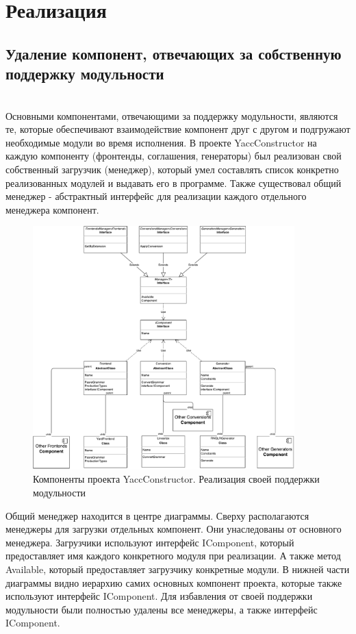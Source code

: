 \documentclass{matmex-diploma}
\begin{document}
\section{Реализация}
\begin{enumerate}
\subsection {Удаление компонент, отвечающих за собственную \\поддержку модульности}
\\Основными компонентами, отвечающими за поддержку модульности, являются те, которые обеспечивают взаимодействие компонент друг с другом и подгружают необходимые модули во время исполнения.
В проекте YaccConstructor на каждую компоненту (фронтенды, соглашения, генераторы) был реализован свой собственный загрузчик (менеджер), который умел составлять список конкретно реализованных модулей и выдавать его в программе. Также существовал общий менеджер - абстрактный интерфейс для реализации каждого отдельного менеджера компонент.

\begin{figure}[h!]
\begin{center}
\includegraphics[width=0.9\textwidth]{yc_was}
\caption{Компоненты проекта YaccConstructor. Реализация своей поддержки модульности}
\label{fig:yc_was} 
\end{center}
\end{figure}

\newpage
Общий менеджер находится в центре диаграммы. Сверху располагаются менеджеры для загрузки отдельных компонент. Они унаследованы от основного менеджера. Загрузчики используют интерфейс IComponent, который предоставляет имя каждого конкретного модуля при реализации. А также метод Available, который предоставляет загрузчику конкретные модули. В нижней части диаграммы видно иерархию самих основных компонент проекта, которые также используют интерфейс  IComponent. Для избавления от своей поддержки модульности были полностью удалены все менеджеры, а также интерфейс IComponent.


\end{enumerate}
\end{document}
